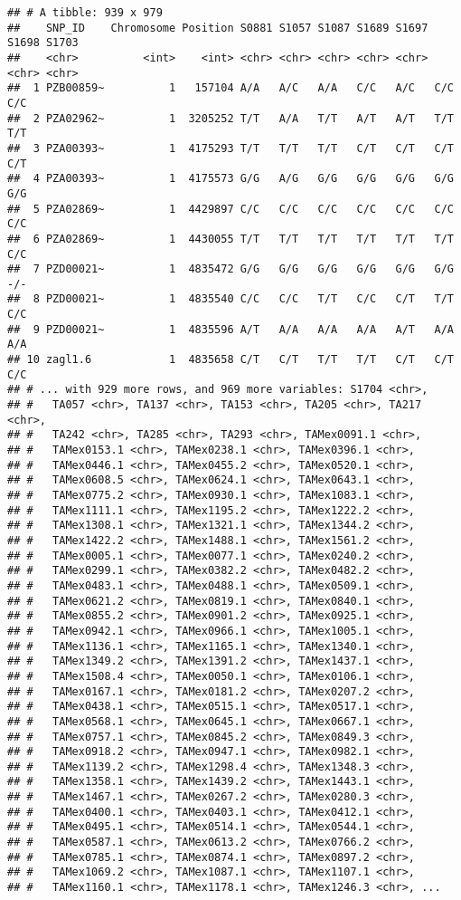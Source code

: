 \documentclass[]{article}
\begin{document}
\begin{verbatim}
## # A tibble: 939 x 979
##    SNP_ID    Chromosome Position S0881 S1057 S1087 S1689 S1697 S1698 S1703
##    <chr>          <int>    <int> <chr> <chr> <chr> <chr> <chr> <chr> <chr>
##  1 PZB00859~          1   157104 A/A   A/C   A/A   C/C   A/C   C/C   C/C  
##  2 PZA02962~          1  3205252 T/T   A/A   T/T   A/T   A/T   T/T   T/T  
##  3 PZA00393~          1  4175293 T/T   T/T   T/T   C/T   C/T   C/T   C/T  
##  4 PZA00393~          1  4175573 G/G   A/G   G/G   G/G   G/G   G/G   G/G  
##  5 PZA02869~          1  4429897 C/C   C/C   C/C   C/C   C/C   C/C   C/C  
##  6 PZA02869~          1  4430055 T/T   T/T   T/T   T/T   T/T   T/T   C/C  
##  7 PZD00021~          1  4835472 G/G   G/G   G/G   G/G   G/G   G/G   -/-  
##  8 PZD00021~          1  4835540 C/C   C/C   T/T   C/C   C/T   T/T   C/C  
##  9 PZD00021~          1  4835596 A/T   A/A   A/A   A/A   A/T   A/A   A/A  
## 10 zagl1.6            1  4835658 C/T   C/T   T/T   T/T   C/T   C/T   C/C  
## # ... with 929 more rows, and 969 more variables: S1704 <chr>,
## #   TA057 <chr>, TA137 <chr>, TA153 <chr>, TA205 <chr>, TA217 <chr>,
## #   TA242 <chr>, TA285 <chr>, TA293 <chr>, TAMex0091.1 <chr>,
## #   TAMex0153.1 <chr>, TAMex0238.1 <chr>, TAMex0396.1 <chr>,
## #   TAMex0446.1 <chr>, TAMex0455.2 <chr>, TAMex0520.1 <chr>,
## #   TAMex0608.5 <chr>, TAMex0624.1 <chr>, TAMex0643.1 <chr>,
## #   TAMex0775.2 <chr>, TAMex0930.1 <chr>, TAMex1083.1 <chr>,
## #   TAMex1111.1 <chr>, TAMex1195.2 <chr>, TAMex1222.2 <chr>,
## #   TAMex1308.1 <chr>, TAMex1321.1 <chr>, TAMex1344.2 <chr>,
## #   TAMex1422.2 <chr>, TAMex1488.1 <chr>, TAMex1561.2 <chr>,
## #   TAMex0005.1 <chr>, TAMex0077.1 <chr>, TAMex0240.2 <chr>,
## #   TAMex0299.1 <chr>, TAMex0382.2 <chr>, TAMex0482.2 <chr>,
## #   TAMex0483.1 <chr>, TAMex0488.1 <chr>, TAMex0509.1 <chr>,
## #   TAMex0621.2 <chr>, TAMex0819.1 <chr>, TAMex0840.1 <chr>,
## #   TAMex0855.2 <chr>, TAMex0901.2 <chr>, TAMex0925.1 <chr>,
## #   TAMex0942.1 <chr>, TAMex0966.1 <chr>, TAMex1005.1 <chr>,
## #   TAMex1136.1 <chr>, TAMex1165.1 <chr>, TAMex1340.1 <chr>,
## #   TAMex1349.2 <chr>, TAMex1391.2 <chr>, TAMex1437.1 <chr>,
## #   TAMex1508.4 <chr>, TAMex0050.1 <chr>, TAMex0106.1 <chr>,
## #   TAMex0167.1 <chr>, TAMex0181.2 <chr>, TAMex0207.2 <chr>,
## #   TAMex0438.1 <chr>, TAMex0515.1 <chr>, TAMex0517.1 <chr>,
## #   TAMex0568.1 <chr>, TAMex0645.1 <chr>, TAMex0667.1 <chr>,
## #   TAMex0757.1 <chr>, TAMex0845.2 <chr>, TAMex0849.3 <chr>,
## #   TAMex0918.2 <chr>, TAMex0947.1 <chr>, TAMex0982.1 <chr>,
## #   TAMex1139.2 <chr>, TAMex1298.4 <chr>, TAMex1348.3 <chr>,
## #   TAMex1358.1 <chr>, TAMex1439.2 <chr>, TAMex1443.1 <chr>,
## #   TAMex1467.1 <chr>, TAMex0267.2 <chr>, TAMex0280.3 <chr>,
## #   TAMex0400.1 <chr>, TAMex0403.1 <chr>, TAMex0412.1 <chr>,
## #   TAMex0495.1 <chr>, TAMex0514.1 <chr>, TAMex0544.1 <chr>,
## #   TAMex0587.1 <chr>, TAMex0613.2 <chr>, TAMex0766.2 <chr>,
## #   TAMex0785.1 <chr>, TAMex0874.1 <chr>, TAMex0897.2 <chr>,
## #   TAMex1069.2 <chr>, TAMex1087.1 <chr>, TAMex1107.1 <chr>,
## #   TAMex1160.1 <chr>, TAMex1178.1 <chr>, TAMex1246.3 <chr>, ...
\end{verbatim}
\end{document}
